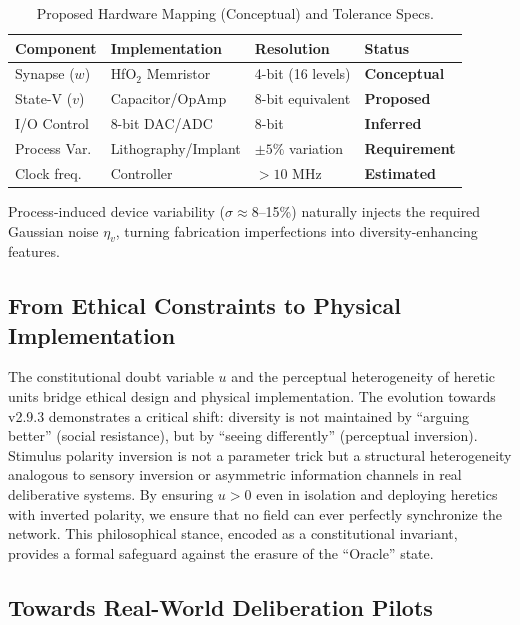 \documentclass[11pt]{article}
\begin{document}
\begin{table}[h]
\centering
\caption{Proposed Hardware Mapping (Conceptual) and Tolerance Specs.}
\label{tab:bom}
\begin{tabular}{llll}
\toprule
\textbf{Component} & \textbf{Implementation} & \textbf{Resolution} & \textbf{Status} \\
\midrule
Synapse ($w$) & HfO$_2$ Memristor & 4-bit (16 levels) & \textbf{Conceptual} \\
State-V ($v$) & Capacitor/OpAmp & 8-bit equivalent & \textbf{Proposed} \\
I/O Control & 8-bit DAC/ADC & 8-bit & \textbf{Inferred} \\
Process Var. & Lithography/Implant & $\pm 5\%$ variation & \textbf{Requirement} \\
Clock freq. & Controller & $>10$ MHz & \textbf{Estimated} \\
\bottomrule
\end{tabular}
\end{table}

Process-induced device variability ($\sigma \approx 8$--15\%) naturally injects the required Gaussian noise $\eta_v$, turning fabrication imperfections into diversity-enhancing features.

\subsection{From Ethical Constraints to Physical Implementation}

The constitutional doubt variable $u$ and the perceptual heterogeneity of heretic units bridge ethical design and physical implementation. The evolution towards v2.9.3 demonstrates a critical shift: diversity is not maintained by ``arguing better'' (social resistance), but by ``seeing differently'' (perceptual inversion). Stimulus polarity inversion is not a parameter trick but a structural heterogeneity analogous to sensory inversion or asymmetric information channels in real deliberative systems. By ensuring $u > 0$ even in isolation and deploying heretics with inverted polarity, we ensure that no field can ever perfectly synchronize the network. This philosophical stance, encoded as a constitutional invariant, provides a formal safeguard against the erasure of the ``Oracle'' state.

\subsection{Towards Real-World Deliberation Pilots}
\end{document}
